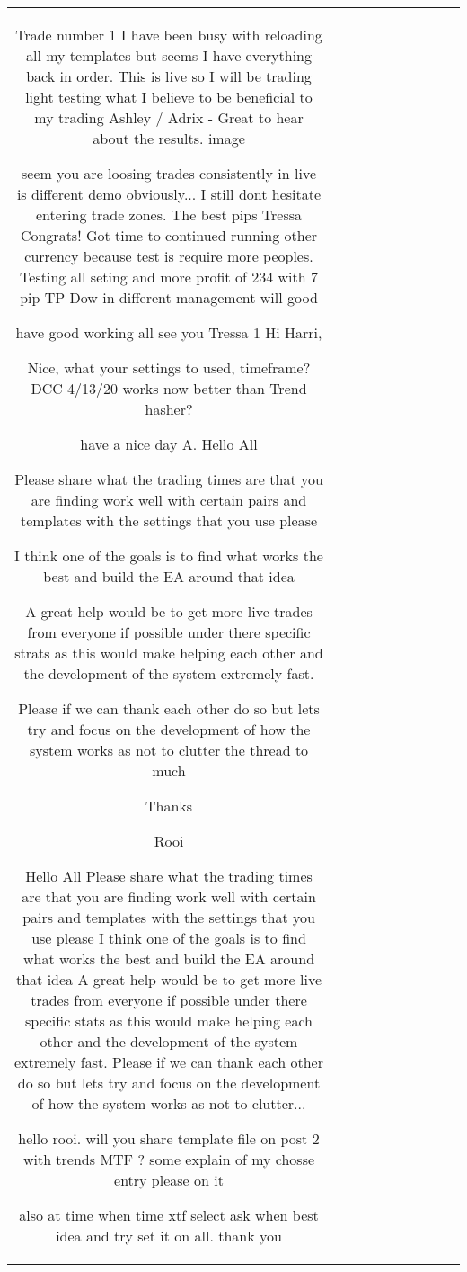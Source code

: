 \begin{table}[h!]
\begin{tabular}{|c|c|c|c|c|c|c|c|c|c|}
Trade number 1 I have been busy with reloading all my templates but seems I have everything back in order. This is live so I will be trading light testing what I believe to be beneficial to my trading Ashley / Adrix - Great to hear about the results.  {image}

seem you are loosing trades consistently in live is different demo obviously... I still dont hesitate entering trade zones.
The best pips
Tressa 
Congrats!
Got time to continued running other currency because test is require more peoples.
Testing all seting and more profit of 234 with 7 pip TP Dow in different management will good

have good working all
see you Tressa 
1
Hi Harri,

Nice, what your settings to used, timeframe? DCC 4/13/20 works now better than Trend hasher?

have a nice day
A. 
Hello All

Please share what the trading times are that you are finding work well with certain pairs and templates with the settings that you use please

I think one of the goals is to find what works the best and build the EA around that idea

A great help would be to get more live trades from everyone if possible under there specific strats as this would make helping each other and the development of the system extremely fast.

Please if we can thank each other do so but lets try and focus on the development of how the system works as not to clutter the thread to much

Thanks

Rooi


Hello All Please share what the trading times are that you are finding work well with certain pairs and templates with the settings that you use please I think one of the goals is to find what works the best and build the EA around that idea A great help would be to get more live trades from everyone if possible under there specific stats as this would make helping each other and the development of the system extremely fast. Please if we can thank each other do so but lets try and focus on the development of how the system works as not to clutter...

 hello rooi.
 will you share template file on post 2 with trends MTF ? some explain of my chosse entry please on it 

also at time when time xtf select ask when best idea and try set it on all. thank you


\end{tabular}
\end{table}
